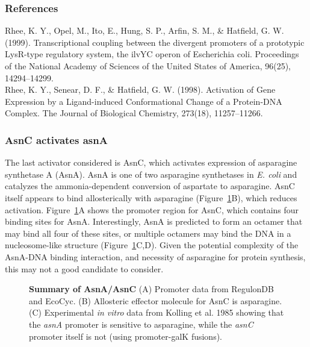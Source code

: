 \documentclass[12pt]{article}
\begin{document}
\subsubsection*{References}

\noindent Rhee, K. Y., Opel, M., Ito, E., Hung, S. P., Arfin, S. M., & Hatfield, G. W.
(1999). Transcriptional coupling between the divergent promoters of a prototypic
LysR-type regulatory system, the ilvYC operon of Escherichia coli. Proceedings
of the National Academy of Sciences of the United States of America, 96(25),
14294–14299. \\

\noindent Rhee, K. Y., Senear, D. F., & Hatfield, G. W. (1998). Activation of Gene
Expression by a Ligand-induced Conformational Change of a Protein-DNA Complex.
The Journal of Biological Chemistry, 273(18), 11257–11266.

\newpage
\subsubsection*{AsnC activates asnA}

The last activator considered is AsnC, which activates expression of asparagine
synthetase A (AsnA). AsnA is one of two asparagine synthetases in \textit{E. coli} and
catalyzes the ammonia-dependent conversion of aspartate to asparagine. AsnC
itself appears to bind allosterically with asparagine (Figure~\ref{AsnA}B),
which reduces activation. Figure~\ref{AsnA}A shows the promoter region for AsnC,
which contains four binding sites for AsnA. Interestingly, AsnA is predicted to
form an octamer that may bind all four of these sites, or multiple octamers may
bind the DNA in a nucleosome-like structure (Figure~\ref{AsnA}C,D). Given the
potential complexity of the AsnA-DNA binding interaction, and necessity of
asparagine for protein synthesis, this may not a good candidate to
consider.

\begin{figure}[ht!]
 \centering
 \caption{
       \textbf{Summary of AsnA/AsnC} (A) Promoter data from RegulonDB and EcoCyc. (B) Allosteric
       effector molecule for AsnC is asparagine. (C) Experimental \textit{in vitro} data from
       Kolling et al. 1985 showing that the \textit{asnA} promoter is sensitive to asparagine, while
       the \textit{asnC} promoter itself is not (using promoter-galK fusions).}
 \label{AsnA}
\end{figure}
\\
\end{document}
